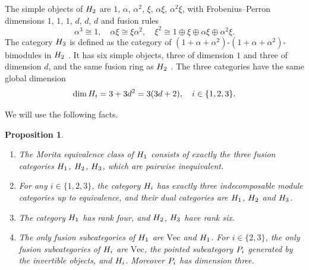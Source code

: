 \documentclass[leqno]{article}
\let\cal\relax
\newcommand{\cal}{\mathcal}
\newtheorem{prop}[thm]{Proposition}
\numberwithin{equation}{section}
\begin{document}
The simple objects of $\cal H_2$ are $1$, $\alpha$, $\alpha^2$, $\xi$, $\alpha\xi$, $\alpha^2\xi$, with Frobenius--Perron dimensions $1$, $1$, $1$, $d$, $d$, $d$ and fusion rules
\begin{equation}
\label{eq:H2-rules}
\alpha^3 \cong 1,\quad \alpha\xi \cong \xi\alpha^2,\quad \xi^2 \cong 1 \oplus \xi \oplus \alpha\xi \oplus \alpha^2\xi.
\end{equation}
The category $\cal H_3$ is defined as the category of $(1+\alpha+\alpha^2)$-$(1+\alpha+\alpha^2)$-bimodules in $\cal H_2$ \cite[Definition 3.19 p.~23]{GrS12}. It has six simple objects, three of dimension $1$ and three of dimension $d$, and the same fusion ring as $\cal H_2$ \cite[Theorem 1.4 p.~4]{GrS12}. The three categories have the same global dimension
\begin{equation}
\label{eq:global-dimension}
\dim \cal H_i = 3+3d^2 = 3(3d+2), \quad i \in \{1,2,3\}.
\end{equation}

We will use the following facts.

\begin{prop}
\label{prop:GS}
\begin{enumerate}
\item The Morita equivalence class of $\cal H_1$ consists of exactly the three fusion categories $\cal H_1$, $\cal H_2$, $\cal H_3$, which are pairwise inequivalent.
\item For any $i \in \{1,2,3\}$, the category $\cal H_i$ has exactly three indecomposable module categories up to equivalence, and their dual categories are $\cal H_1$, $\cal H_2$ and $\cal H_3$.
\item The category $\cal H_1$ has rank four, and $\cal H_2$, $\cal H_3$ have rank six.
\item The only fusion subcategories of $\cal H_1$ are $\mathrm{Vec}$ and $\cal H_1$. For $i \in \{2,3\}$, the only fusion subcategories of $\cal H_i$ are $\mathrm{Vec}$, the pointed subcategory $\cal P_i$ generated by the invertible objects, and $\cal H_i$. Moreover $\cal P_i$ has dimension three.
\end{enumerate}
\end{prop}
\end{document}
